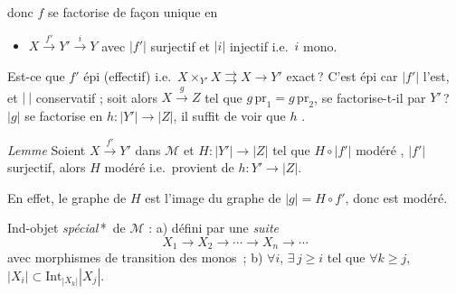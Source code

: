 \documentclass[11pt,a4paper]{article}
\begin{document}


donc $f$ se factorise de façon  unique en
\begin{itemize}
  \item[(M3$'$)] $X \xrightarrow{f'} Y' \xrightarrow{i} Y$ avec $|f'|$
  surjectif et $|i|$ injectif i.e.\ $i$ mono.
\end{itemize}

Est-ce que $f'$ épi (effectif) i.e.\ $X \times_{Y'} X \rightrightarrows X
\to Y'$ exact\,? C'est épi car $|f'|$ l'est, et $|\ |$ conservatif ; soit
alors $X \xrightarrow{g} Z$ tel que $g\,\mathrm{pr}_1 = g\,\mathrm{pr}_2$,
se factorise-t-il par $Y'$\,? \struck{\ill{}} $|g|$ se factorise en $h :
|Y'| \to |Z|$, il suffit de voir que $h$ .

\emph{Lemme} Soient $X \xrightarrow{f'} Y'$ dans $\mathcal{M}$ et $H : |Y'|
\to |Z|$ tel que $H \circ |f'|$ modéré , $|f'|$ surjectif, alors
$H$ modéré i.e.\ provient de $h : Y' \to |Z|$.

En effet,  le graphe de $H$ est l'image du graphe de
$|g| = H \circ f'$, donc est modéré.

\struck{\ill{}}

Ind-objet \emph{spécial}\,*\ de $\mathcal{M}$ : a) défini par une
\emph{suite}
\[
  X_1 \to X_2 \to \cdots \to X_n \to \cdots
\]
avec morphismes de transition des monos\ ; b) $\forall i$, $\exists\, j
\geqslant i$ tel que $\forall k \geqslant j$, $|X_i| \subset
\mathrm{Int}_{|X_k|} |X_j|$.
\end{document}

